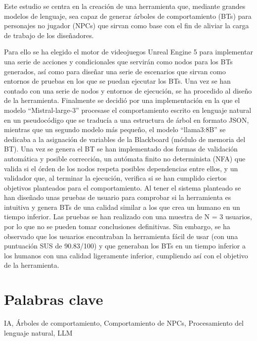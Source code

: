 
Este estudio se centra en la creación de una herramienta que, mediante grandes modelos de lenguaje, sea capaz de generar árboles de comportamiento (BTs) para personajes no jugador (NPCs) que sirvan como base con el fin de aliviar la carga de trabajo de los diseñadores.

Para ello se ha elegido el motor de videojuegos Unreal Engine 5 para implementar una serie de acciones y condicionales que servirán como nodos para los BTs generados, así como para diseñar una serie de escenarios que sirvan como entornos de pruebas en los que se puedan ejecutar los BTs.
Una vez se han contado con una serie de nodos y entornos de ejecución, se ha procedido al diseño de la herramienta.
Finalmente se decidió por una implementación en la que el modelo ``Mistral-large-3'' procesase el comportamiento escrito en lenguaje natural en un pseudocódigo que se traducía a una estructura de árbol en formato JSON, mientras que un segundo modelo más pequeño, el modelo ``llama3:8B'' se dedicaba a la asignación de variables de la Blackboard (módulo de memoria del BT).
Una vez se genera el BT se han implementado dos formas de validación automática y posible corrección, un autómata finito no determinista (NFA) que valida si el órden de los nodos respeta posibles dependencias entre ellos, y un validador que, al terminar la ejecución, verifica si se han cumplido ciertos objetivos planteados para el comportamiento.
Al tener el sistema planteado se han diseñado unas pruebas de usuario para comprobar si la herramienta es intuitiva y genera BTs de una calidad similar a los que crea un humano en un tiempo inferior.
Las pruebas se han realizado con una muestra de N = 3 usuarios, por lo que no se pueden tomar conclusiones definitivas.
Sin embargo, se ha observado que los usuarios encontraban la herramienta fácil de usar (con una puntuación SUS de 90.83/100) y que generaban los BTs en un tiempo inferior a los humanos con una calidad ligeramente inferior, cumpliendo así con el objetivo de la herramienta.


\section*{Palabras clave}

\noindent IA, Árboles de comportamiento, Comportamiento de NPCs, Procesamiento del lenguaje natural, LLM




